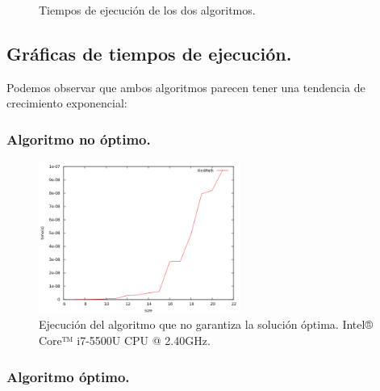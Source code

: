 \documentclass[11pt,a4paper]{article}
\begin{document}
\begin{figure}[h]
\begin{tabular}{| >{\centering\arraybackslash}m{1in} | >{\centering\arraybackslash}m{1in} | >{\centering\arraybackslash}m{1in} |}
				\end{tabular}
				\caption{Tiempos de ejecución de los dos algoritmos.}

			\end{figure}

\newpage

		\subsection{Gráficas de tiempos de ejecución.}

			\par
			Podemos observar que ambos algoritmos parecen tener una tendencia de crecimiento exponencial:

			\subsubsection{Algoritmo no óptimo.}

				\begin{figure}[h]

					\centering
					\includegraphics[width=0.59\textwidth]{FindPath.png}
					\caption{Ejecución del algoritmo que no garantiza la solución óptima. Intel® Core™ i7-5500U CPU @ 2.40GHz.}
					
				\end{figure}

			\subsubsection{Algoritmo óptimo.}
\end{document}
